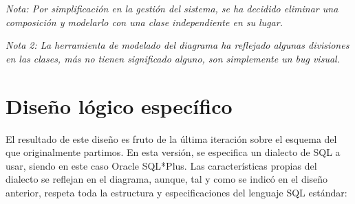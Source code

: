 \textit{Nota: Por simplificación en la gestión del sistema, se ha decidido eliminar una composición y modelarlo con una clase independiente en su lugar.}

\textit{Nota 2: La herramienta de modelado del diagrama ha reflejado algunas divisiones en las clases, más no tienen significado alguno, son simplemente un bug visual.}

\newpage
\section{Diseño lógico específico}
El resultado de este diseño es fruto de la última iteración sobre el esquema del que originalmente partimos. En esta versión, se especifica un dialecto de SQL a usar, siendo en este caso Oracle SQL*Plus. Las características propias del dialecto se reflejan en el diagrama, aunque, tal y como se indicó en el diseño anterior, respeta toda la estructura y especificaciones del lenguaje SQL estándar:
